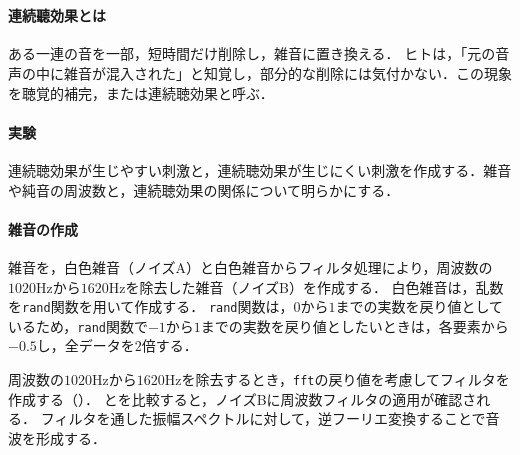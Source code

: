 \section{\kadaidb}\label{sec:\kadaidb}
\purpose
\paragraph{連続聽効果とは}
ある一連の音を一部，短時間だけ削除し，雑音に置き換える．
ヒトは，「元の音声の中に雑音が混入された」と知覚し，部分的な削除には気付かない．この現象を聴覚的補完，または連続聴効果と呼ぶ．\cite[p.182\ -\ p.183]{感覚知覚心理学}
\paragraph{実験}
連続聴効果が生じやすい刺激と，連続聴効果が生じにくい刺激を作成する．雑音や純音の周波数と，連続聴効果の関係について明らかにする．
\method
\paragraph{雑音の作成}
雑音を，白色雑音（ノイズA）と白色雑音からフィルタ処理により，周波数の\(1020\textrm{Hz}\)から\(1620\textrm{Hz}\)を除去した雑音（ノイズB）を作成する．
白色雑音は，乱数を\texttt{rand}関数を用いて作成する．
\texttt{rand}関数は，\(0\)から\(1\)までの実数を戻り値としているため，\texttt{rand}関数で\(-1\)から\(1\)までの実数を戻り値としたいときは，各要素から\(-0.5\)し，全データを\(2\)倍する．\par
周波数の\(1020\textrm{Hz}\)から\(1620\textrm{Hz}\)を除去するとき，\texttt{fft}の戻り値を考慮してフィルタを作成する（）．
とを比較すると，ノイズBに周波数フィルタの適用が確認される．
フィルタを通した振幅スペクトルに対して，逆フーリエ変換することで音波を形成する．\par
